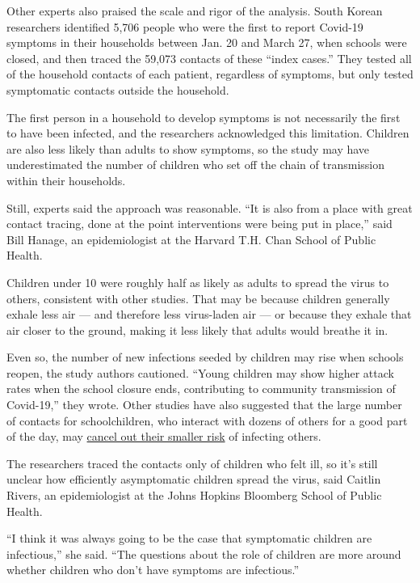 Other experts also praised the scale and rigor of the analysis. South
Korean researchers identified 5,706 people who were the first to report
Covid-19 symptoms in their households between Jan. 20 and March 27, when
schools were closed, and then traced the 59,073 contacts of these
``index cases.'' They tested all of the household contacts of each
patient, regardless of symptoms, but only tested symptomatic contacts
outside the household.

The first person in a household to develop symptoms is not necessarily
the first to have been infected, and the researchers acknowledged this
limitation. Children are also less likely than adults to show symptoms,
so the study may have underestimated the number of children who set off
the chain of transmission within their households.

Still, experts said the approach was reasonable. ``It is also from a
place with great contact tracing, done at the point interventions were
being put in place,'' said Bill Hanage, an epidemiologist at the Harvard
T.H. Chan School of Public Health.

Children under 10 were roughly half as likely as adults to spread the
virus to others, consistent with other studies. That may be because
children generally exhale less air --- and therefore less virus-laden
air --- or because they exhale that air closer to the ground, making it
less likely that adults would breathe it in.

Even so, the number of new infections seeded by children may rise when
schools reopen, the study authors cautioned. ``Young children may show
higher attack rates when the school closure ends, contributing to
community transmission of Covid-19,'' they wrote. Other studies have
also suggested that the large number of contacts for schoolchildren, who
interact with dozens of others for a good part of the day, may
\href{https://www.nytimes3xbfgragh.onion/2020/05/05/health/coronavirus-children-transmission-school.html}{cancel
out their smaller risk} of infecting others.

The researchers traced the contacts only of children who felt ill, so
it's still unclear how efficiently asymptomatic children spread the
virus, said Caitlin Rivers, an epidemiologist at the Johns Hopkins
Bloomberg School of Public Health.

``I think it was always going to be the case that symptomatic children
are infectious,'' she said. ``The questions about the role of children
are more around whether children who don't have symptoms are
infectious.''


